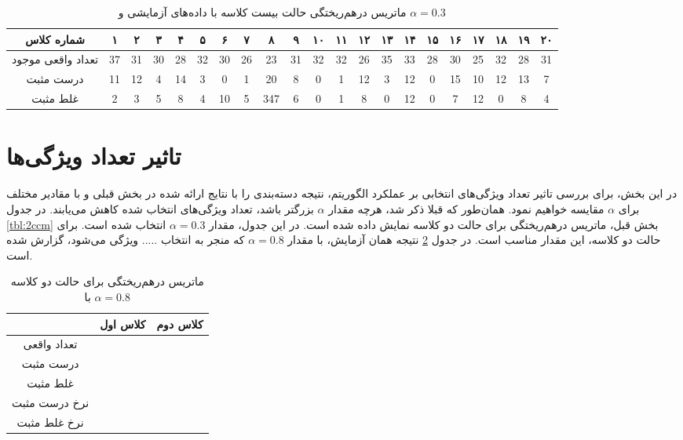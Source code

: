 \documentclass[11.5pt,a4paper]{article}
\begin{document}
\begin{table}[h]
\center
\caption{ماتریس درهم‌ریختگی حالت بیست کلاسه با داده‌های آزمایشی و $\alpha = 0.3$}
\label{tbl:20ccm171ts}
\begin{tabular}{c | c | c | c | c | c | c | c | c | c | c | c | c | c | c | c | c | c | c | c | c }
  شماره کلاس & ۱ & ۲ & ۳ & ۴ & ۵ & ۶ & ۷ & ۸ & ۹ & ۱۰ & ۱۱ & ۱۲ & ۱۳ & ۱۴ & ۱۵ & ۱۶ & ۱۷ & ۱۸ & ۱۹ & ۲۰ \\
\hline
\hline
تعداد واقعی موجود& 37  &  31  &  30  &  28  &  32  &  30  &  26  &  23  &  31  &  32  & 32   &  26  &  35  &  33  &  28  &  30  &  25  &  32  &  28  &   31 \\
درست مثبت& 11  &  12  &  4  &  14  &  3  &  0  &  1  &  20  &  8  &  0  &  1  &  12  & 3   &  12  &  0  &  15  &  10  &   12 &  13  &  7  \\
غلط مثبت&  2 &  3  & 5   &  8  &  4  &  10  &  5  &  347  &  6  & 0   &  1  &  8  & 0   &   12 &  0  &  7  &  12  &  0  &  8  &  4  \\

\end{tabular}
\end{table}

\section{تاثیر تعداد ویژگی‌ها}
در این بخش، برای بررسی تاثیر تعداد ویژگی‌های انتخابی بر عملکرد الگوریتم،‌ نتیجه دسته‌بندی را با نتایج ارائه شده در بخش قبلی و با مقادیر مختلف برای $\alpha$ مقایسه خواهیم نمود. همان‌طور که قبلا ذکر شد،‌ هرچه مقدار $\alpha$ بزرگتر باشد، تعداد ویژگی‌های انتخاب شده کاهش می‌یابند. در جدول \ref{tbl:2ccm} بخش قبل، ماتریس درهم‌ریختگی برای حالت دو کلاسه نمایش داده شده است. در این جدول،‌ مقدار $\alpha = 0.3$ انتخاب شده است. برای حالت دو کلاسه،‌ این مقدار مناسب است. در جدول 
\ref{tbl:2ccm8}
نتیجه همان آزمایش، با مقدار $\alpha = 0.8$ که منجر به انتخاب 
.....
ویژگی می‌شود،
گزارش شده است. 

\begin{table}[h]
\center
\caption{ماتریس درهم‌ریختگی برای حالت دو کلاسه با $\alpha = 0.8$}
\label{tbl:2ccm8}
\begin{tabular}{c | c | c}
& کلاس اول & کلاس دوم
\\
\hline
\hline

تعداد واقعی & &
\\
درست مثبت &&
\\
غلط مثبت&&
\\
نرخ درست مثبت&&
\\
نرخ غلط مثبت&&
\\

\end{tabular}
\end{table}
\end{document}
